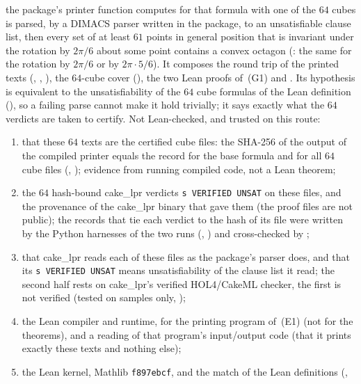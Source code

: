 \begin{enumerate}[label=(G\arabic*)]
the package's printer function computes for that formula with one of the $64$ cubes is parsed, by a DIMACS parser
written in the package, to an unsatisfiable clause list, then every set of at least $61$ points in general position
that is invariant under the rotation by $2\pi/6$ about some point contains a convex octagon
(: the same for the rotation by $2\pi/6$ or by $2\pi\cdot5/6$). It
composes the round trip of the printed texts (, ,
), the $64$-cube cover (), the two Lean
proofs of~(G1) and . Its hypothesis is equivalent to the unsatisfiability of the $64$ cube
formulas of the Lean definition (), so a failing parse cannot make it hold
trivially; it says exactly what the $64$ verdicts are taken to certify. Not Lean-checked,
and trusted on this route:
\begin{enumerate}[label=(E\arabic*)]
\item that these $64$ texts are the certified cube files: the SHA-256 of the output of the compiled printer equals the
record for the base formula and for all $64$ cube files (,
); evidence from running compiled code, not a Lean theorem;
\item the $64$ hash-bound cake\_lpr verdicts \texttt{s VERIFIED UNSAT} on these files, and the provenance of the
cake\_lpr binary that gave them (the proof files are not public); the records that tie each verdict to the hash of
its file were written by the Python harnesses of the two runs (,
) and cross-checked by ;
\item that cake\_lpr reads each of these files as the package's parser does, and that its \texttt{s VERIFIED UNSAT}
means unsatisfiability of the clause list it read; the second half rests on cake\_lpr's verified HOL4/CakeML
checker, the first is not verified (tested on samples only, );
\item the Lean compiler and runtime, for the printing program of~(E1) (not for the theorems), and a reading of that
program's input/output code (that it prints exactly these texts and nothing else);
\item the Lean kernel, Mathlib \texttt{f897ebcf}, and the match of the Lean definitions (,

\end{enumerate}
\end{enumerate}
